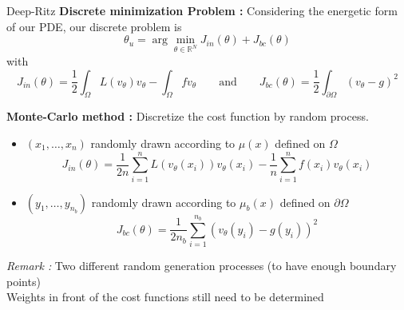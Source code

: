 \begin{frame}{Deep-Ritz}
	\small 
	\textbf{Discrete minimization Problem :} Considering the energetic form of our PDE, our discrete problem is
	\begin{equation}
		\theta_u=\arg\min_{\theta\in\mathbb{R}^N} J_{in}(\theta)+J_{bc}(\theta) \label{minpb_deepritz}
	\end{equation}
	with 
	\begin{equation*}
		J_{in}(\theta)=\frac{1}{2}\int_\Omega L(v_\theta)v_\theta - \int_\Omega fv_\theta  \qquad \text{and} \qquad J_{bc}(\theta)=\frac{1}{2}\int_{\partial\Omega} (v_\theta-g)^2
	\end{equation*}	
	
	\textbf{Monte-Carlo method :} Discretize the cost function by random process.
	
	\begin{itemize}[\textbullet]
		\item $(x_1,\dots,x_n)$ randomly drawn according to $\mu(x)$ defined on $\Omega$ 
		\begin{equation*}
			J_{in}(\theta)=\frac{1}{2n}\sum_{i=1}^n L(v_\theta(x_i))v_\theta(x_i) - \frac{1}{n}\sum_{i=1}^n f(x_i)v_\theta(x_i)
		\end{equation*}
		\item $(y_1,\dots,y_{n_b})$ randomly drawn according to $\mu_b(x)$ defined on $\partial\Omega$
		\begin{equation*}
			J_{bc}(\theta)=\frac{1}{2n_b}\sum_{i=1}^{n_b} (v_\theta(y_i)-g(y_i))^2
		\end{equation*}
	\end{itemize}	

	\footnotesize
	\textit{Remark :}  Two different random generation processes (to have enough boundary points) \\
	 Weights in front of the cost functions still need to be determined
\end{frame}

